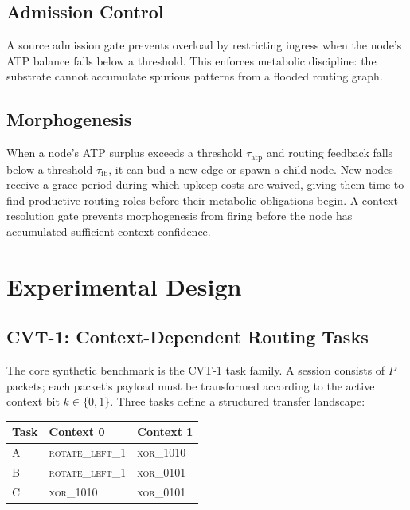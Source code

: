 \documentclass[10pt,twocolumn]{article}
\begin{document}
\subsection{Admission Control}

A source admission gate prevents overload by restricting ingress when the
node's ATP balance falls below a threshold.
This enforces metabolic discipline: the substrate cannot accumulate spurious
patterns from a flooded routing graph.

\subsection{Morphogenesis}

When a node's ATP surplus exceeds a threshold $\tau_{\mathrm{atp}}$ and
routing feedback falls below a threshold $\tau_{\mathrm{fb}}$, it can bud a
new edge or spawn a child node.
New nodes receive a grace period during which upkeep costs are waived, giving
them time to find productive routing roles before their metabolic obligations
begin.
A context-resolution gate prevents morphogenesis from firing before the
node has accumulated sufficient context confidence.

\section{Experimental Design}
\label{sec:experiments}

\subsection{CVT-1: Context-Dependent Routing Tasks}

The core synthetic benchmark is the CVT-1 task family.
A session consists of $P$ packets; each packet's payload must be transformed
according to the active context bit $k \in \{0, 1\}$.
Three tasks define a structured transfer landscape:

\begin{center}
\small
\begin{tabular}{lll}
\toprule
Task & Context 0 & Context 1 \\
\midrule
A & \textsc{rotate\_left\_1} & \textsc{xor\_1010} \\
B & \textsc{rotate\_left\_1} & \textsc{xor\_0101} \\
C & \textsc{xor\_1010}       & \textsc{xor\_0101} \\
\bottomrule
\end{tabular}
\end{center}
\end{document}
